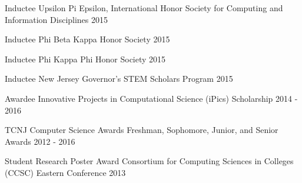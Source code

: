 
\begin{cvhonors}

  \cvhonor
    {Inductee} %
    {Upsilon Pi Epsilon, International Honor Society for Computing and Information Disciplines} %
    {2015} %

  \cvhonor
    {Inductee} %
    {Phi Beta Kappa Honor Society} %
    {2015} %

  \cvhonor
    {Inductee} %
    {Phi Kappa Phi Honor Society} %
    {2015} %

  \cvhonor
    {Inductee} %
    {New Jersey Governor's STEM Scholars Program} %
    {2015} %

  \cvhonor
    {Awardee} %
    {Innovative Projects in Computational Science (iPics) Scholarship} %
    {2014 - 2016} %

  \cvhonor
    {TCNJ Computer Science Awards} %
    {Freshman, Sophomore, Junior, and Senior Awards} %
    {2012 - 2016} %

  \cvhonor
    {Student Research Poster Award} %
    {Consortium for Computing Sciences in Colleges (CCSC) Eastern Conference} %
    {2013} %

\end{cvhonors}
